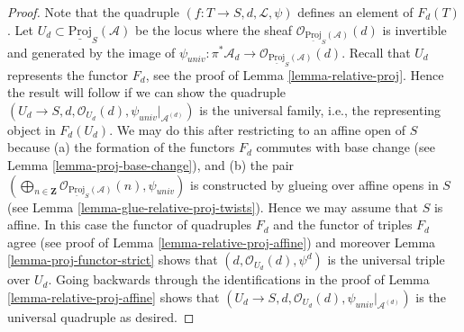\documentclass{stacks-project}
\theoremstyle{plain}
\theoremstyle{definition}
\theoremstyle{remark}
\numberwithin{equation}{subsection}
\begin{document}
\begin{proof}
Note that the quadruple $(f : T \to S, d, \mathcal{L}, \psi)$
defines an element of $F_d(T)$. Let
$U_d \subset \underline{\text{Proj}}_S(\mathcal{A})$
be the locus
where the sheaf $\mathcal{O}_{\underline{\text{Proj}}_S(\mathcal{A})}(d)$
is invertible and generated by the image of
$\psi_{univ} : \pi^*\mathcal{A}_d \to
\mathcal{O}_{\underline{\text{Proj}}_S(\mathcal{A})}(d)$.
Recall that $U_d$ represents the functor $F_d$, see the proof
of Lemma \ref{lemma-relative-proj}. Hence the result will follow
if we can show the quadruple
$(U_d \to S, d, \mathcal{O}_{U_d}(d), \psi_{univ}|_{\mathcal{A}^{(d)}})$
is the universal family, i.e., the representing object in $F_d(U_d)$.
We may do this after restricting to an affine open of $S$ because
(a) the formation of the functors $F_d$ commutes with base change
(see Lemma \ref{lemma-proj-base-change}), and (b) the pair
$(\bigoplus_{n \in \mathbf{Z}}
\mathcal{O}_{\underline{\text{Proj}}_S(\mathcal{A})}(n),
\psi_{univ})$
is constructed by glueing over affine opens in $S$
(see Lemma \ref{lemma-glue-relative-proj-twists}).
Hence we may assume that $S$ is affine. In this case the functor
of quadruples $F_d$ and the functor of triples $F_d$ agree
(see proof of Lemma \ref{lemma-relative-proj-affine}) and moreover
Lemma \ref{lemma-proj-functor-strict}
shows that $(d, \mathcal{O}_{U_d}(d), \psi^d)$
is the universal triple over $U_d$.
Going backwards through the identifications in the proof of
Lemma \ref{lemma-relative-proj-affine} shows that
$(U_d \to S, d, \mathcal{O}_{U_d}(d), \psi_{univ}|_{\mathcal{A}^{(d)}})$
is the universal quadruple as desired.
\end{proof}
\end{document}
